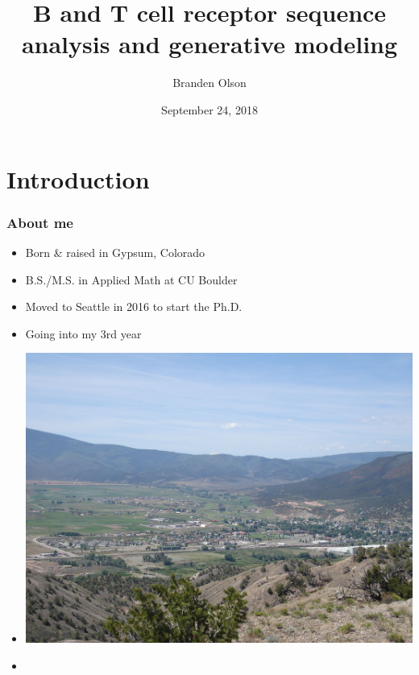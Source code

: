 \documentclass[mathserif,compress]{beamer}
\title[]{B and T cell receptor sequence analysis and generative modeling}
\author[]
{Branden Olson}
\date[Sept. 24, 2018]
{September 24, 2018}
\institute[]
{
Department of Statistics
\\
University of Washington Seattle
}
\renewcommand\;{\,}
\begin{document}
\begin{frame}[noframenumbering]
  \titlepage
\end{frame}

\section{Introduction}

\begin{frame}\frametitle{About me}
\begin{center}
\begin{minipage}{0.49\linewidth}
\begin{itemize}
\bigskip
\item Born \& raised in Gypsum, Colorado
\bigskip
\item B.S./M.S. in Applied Math at CU Boulder
\bigskip
\item Moved to Seattle in 2016 to start the Ph.D.
\bigskip
\item Going into my 3rd year
\end{itemize}
\end{minipage}
\begin{minipage}{0.49\linewidth}
\begin{itemize}
\item[]
\includegraphics[width=\linewidth]{Images/Gypsum.jpg}
\bigskip
\item[]
\begin{center}

\end{center}
\end{itemize}
\end{minipage}
\end{center}
\end{frame}
\end{document}
